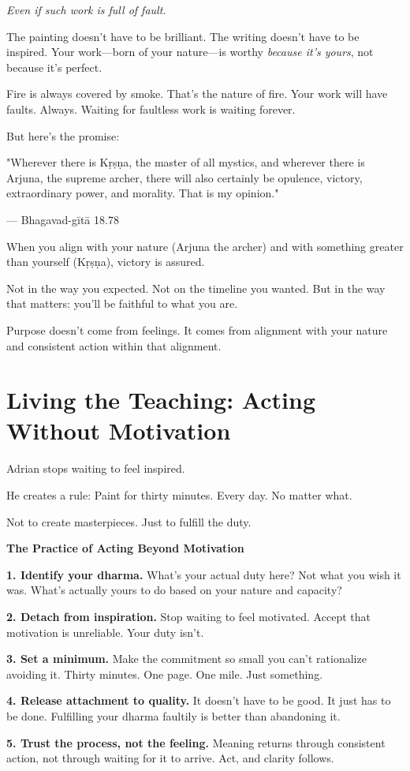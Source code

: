 \documentclass[11pt,twoside]{book}
\begin{document}
\emph{Even if such work is full of fault.}

The painting doesn't have to be brilliant. The writing doesn't have to be inspired. Your work—born of your nature—is worthy \emph{because it's yours}, not because it's perfect.

Fire is always covered by smoke. That's the nature of fire. Your work will have faults. Always. Waiting for faultless work is waiting forever.

But here's the promise:

\begin{pullquote}
"Wherever there is Kṛṣṇa, the master of all mystics, and wherever there is Arjuna, the supreme archer, there will also certainly be opulence, victory, extraordinary power, and morality. That is my opinion."

--- Bhagavad-gītā 18.78
\end{pullquote}

When you align with your nature (Arjuna the archer) and with something greater than yourself (Kṛṣṇa), victory is assured.

Not in the way you expected. Not on the timeline you wanted. But in the way that matters: you'll be faithful to what you are.

Purpose doesn't come from feelings. It comes from alignment with your nature and consistent action within that alignment.

\section*{Living the Teaching: Acting Without Motivation}

Adrian stops waiting to feel inspired.

He creates a rule: Paint for thirty minutes. Every day. No matter what.

Not to create masterpieces. Just to fulfill the duty.

\begin{practicebox}
\textbf{The Practice of Acting Beyond Motivation}

\textbf{1. Identify your dharma.} What's your actual duty here? Not what you wish it was. What's actually yours to do based on your nature and capacity?

\textbf{2. Detach from inspiration.} Stop waiting to feel motivated. Accept that motivation is unreliable. Your duty isn't.

\textbf{3. Set a minimum.} Make the commitment so small you can't rationalize avoiding it. Thirty minutes. One page. One mile. Just something.

\textbf{4. Release attachment to quality.} It doesn't have to be good. It just has to be done. Fulfilling your dharma faultily is better than abandoning it.

\textbf{5. Trust the process, not the feeling.} Meaning returns through consistent action, not through waiting for it to arrive. Act, and clarity follows.
\end{practicebox}
\end{document}
